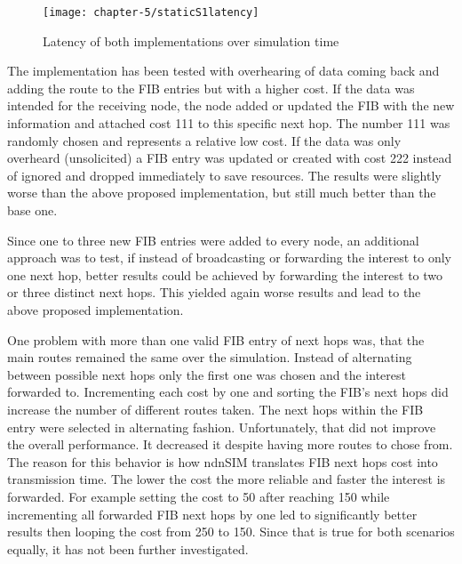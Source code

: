 \begin{figure}[H]
  \centering
  \texttt{[image: chapter-5/staticS1latency]}
  \caption{Latency of both implementations over simulation time}
  \label{fig:staticS1latency}
\end{figure}

The implementation has been tested with overhearing of data coming back and adding the route to the FIB entries but with a higher cost. If the data was intended for the receiving node, the node added or updated the FIB with the new information and attached cost 111 to this specific next hop. The number 111 was randomly chosen and represents a relative low cost. If the data was only overheard (unsolicited) a FIB entry was updated or created with cost 222 instead of ignored and dropped immediately to save resources. The results were slightly worse than the above proposed implementation, but still much better than the base one.

\vspace{5mm} %

Since one to three new FIB entries were added to every node, an additional approach was to test, if instead of broadcasting or forwarding the interest to only one next hop, better results could be achieved by forwarding the interest to two or three distinct next hops. This yielded again worse results and lead to the above proposed implementation.

\vspace{5mm} %

One problem with more than one valid FIB entry of next hops was, that the main routes remained the same over the simulation. Instead of alternating between possible next hops only the first one was chosen and the interest forwarded to. Incrementing each cost by one and sorting the FIB's next hops did increase the number of different routes taken. The next hops within the FIB entry were selected in alternating fashion. Unfortunately, that did not improve the overall performance. It decreased it despite having more routes to chose from. The reason for this behavior is how ndnSIM translates FIB next hops cost into transmission time. The lower the cost the more reliable and faster the interest is forwarded. For example setting the cost to 50 after reaching 150 while incrementing all forwarded FIB next hops by one led to significantly better results then looping the cost from 250 to 150. Since that is true for both scenarios equally, it has not been further investigated.

